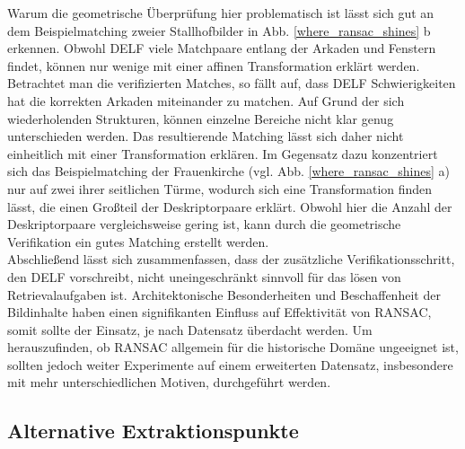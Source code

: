 Warum die geometrische Überprüfung hier problematisch ist lässt sich gut an dem Beispielmatching zweier Stallhofbilder in Abb. \ref{where_ransac_shines} b erkennen. Obwohl DELF viele Matchpaare entlang der Arkaden und Fenstern findet, können nur wenige mit einer affinen Transformation erklärt werden. Betrachtet man die verifizierten Matches, so fällt auf, dass DELF Schwierigkeiten hat die korrekten Arkaden miteinander zu matchen. Auf Grund der sich wiederholenden Strukturen, können einzelne Bereiche nicht klar genug unterschieden werden. Das resultierende Matching lässt sich daher nicht einheitlich mit einer Transformation erklären. Im Gegensatz dazu konzentriert sich das Beispielmatching der Frauenkirche (vgl. Abb. \ref{where_ransac_shines} a) nur auf zwei ihrer seitlichen Türme, wodurch sich eine Transformation finden lässt, die einen Großteil der Deskriptorpaare erklärt. Obwohl hier die Anzahl der Deskriptorpaare vergleichsweise gering ist, kann durch die geometrische Verifikation ein gutes Matching erstellt werden.
\\
Abschließend lässt sich zusammenfassen, dass der zusätzliche Verifikationsschritt, den DELF vorschreibt, nicht uneingeschränkt sinnvoll für das lösen von Retrievalaufgaben ist. Architektonische Besonderheiten und Beschaffenheit der Bildinhalte haben einen signifikanten Einfluss auf Effektivität von RANSAC, somit sollte der Einsatz, je nach Datensatz überdacht werden. Um herauszufinden, ob RANSAC allgemein für die historische Domäne ungeeignet ist, sollten jedoch weiter Experimente auf einem erweiterten Datensatz, insbesondere mit mehr unterschiedlichen Motiven, durchgeführt werden.


\subsection{Alternative Extraktionspunkte}

